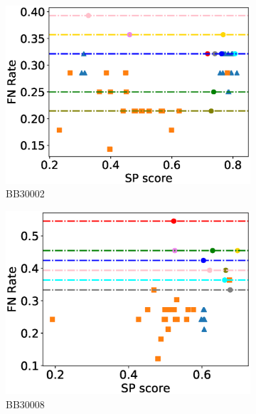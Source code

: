 \begin{figure}[!htbp]
\begin{adjustwidth}{-1cm}{-1cm}
\begin{subfigure}{0.22\textwidth}
			\includegraphics[width=\columnwidth]{Figure/summary/precomputedInit/Balibase/BB30002_fnrate_vs_sp_2}
			\caption{BB30002}
		\end{subfigure}	
		\begin{subfigure}{0.22\textwidth}
			\includegraphics[width=\columnwidth]{Figure/summary/precomputedInit/Balibase/BB30008_fnrate_vs_sp_2}
			\caption{BB30008}
		\end{subfigure}
		\begin{subfigure}{0.22\textwidth}

\end{subfigure}
\end{adjustwidth}
\end{figure}
